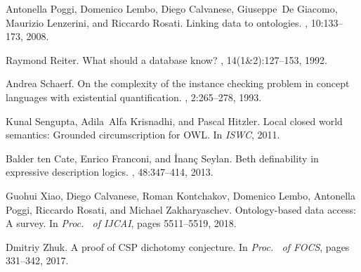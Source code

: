 \documentclass{lmcs}
\theoremstyle{definition}
\begin{document}
\begin{thebibliography}{10}
Antonella Poggi, Domenico Lembo, Diego Calvanese, Giuseppe~De Giacomo, Maurizio
  Lenzerini, and Riccardo Rosati.
\newblock Linking data to ontologies.
, 10:133--173, 2008.

Raymond Reiter.
\newblock What should a database know?
, 14(1{\&}2):127--153, 1992.

Andrea Schaerf.
\newblock On the complexity of the instance checking problem in concept
  languages with existential quantification.
, 2:265--278, 1993.

Kunal Sengupta, Adila~Alfa Krisnadhi, and Pascal Hitzler.
\newblock Local closed world semantics: Grounded circumscription for {OWL}.
\newblock In {\em ISWC}, 2011.

Balder ten Cate, Enrico Franconi, and \.{I}nan\c{c} Seylan.
\newblock Beth definability in expressive description logics.
, 48:347--414, 2013.

Guohui Xiao, Diego Calvanese, Roman Kontchakov, Domenico Lembo, Antonella
  Poggi, Riccardo Rosati, and Michael Zakharyaschev.
\newblock Ontology-based data access: {A} survey.
\newblock In {\em Proc. \ of {IJCAI}}, pages 5511--5519, 2018.

Dmitriy Zhuk.
\newblock A proof of {CSP} dichotomy conjecture.
\newblock In {\em Proc. \ of {FOCS}}, pages 331--342, 2017.

\end{thebibliography}

\newpage
\appendix
\end{document}
